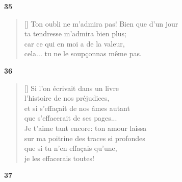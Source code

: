 \documentclass[a4paper,12pt]{book}
\begin{document}
\bigskip

\begin{center}
  \textbf{35}
\end{center}

\settowidth{\versewidth}{Ton oubli ne m'admira pas! Bien que d'un jour}

\begin{verse}[\versewidth]
  Ton oubli ne m'admira pas! Bien que d'un jour \\
  ta tendresse m'admira bien plus; \\
  car ce qui en moi a de la valeur, \\
  cela... tu ne le soupçonnas même pas.
\end{verse}

\bigskip

\begin{center}
  \textbf{36}
\end{center}

\settowidth{\versewidth}{et si s'effaçait de nos âmes autant}

\begin{verse}[\versewidth]
  Si l'on écrivait dans un livre \\
  l'histoire de nos préjudices, \\
  et si s'effaçait de nos âmes autant \\
  que s'effacerait de ses pages... \\
  Je t'aime tant encore: ton amour laissa \\
  sur ma poitrine des traces si profondes \\
  que si tu n'en effaçais qu'une, \\
  je les effacerais toutes!
\end{verse}

\bigskip

\begin{center}
  \textbf{37}
\end{center}

\settowidth{\versewidth}{je porte le fer avec lequel ta main ouvrit}
\end{document}
